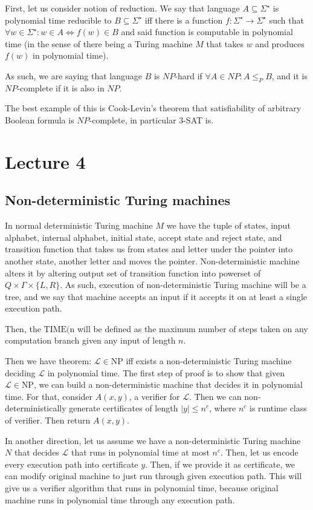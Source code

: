 \documentclass[12pt]{article}
\begin{document}
First, let us consider notion of reduction. We say that language \(A\subseteq \Sigma^{\star}\) is polynomial time reducible to \(B\subseteq \Sigma^{\star}\) iff there is a function \(f\colon \Sigma^{\star}\to \Sigma^{\star}\) such that \(\forall w\in\Sigma^{\star}\colon w\in A\Leftrightarrow f(w)\in B\) and said function is computable in polynomial time (in the sense of there being a Turing machine \(M\) that takes \(w\) and produces \(f(w)\) in polynomial time).

As such, we are saying that language \(B\) is \(NP\)-hard if \(\forall A\in NP\colon A\leq_P B\), and it is \(NP\text{-complete}\) if it is also in \(NP\).

The best example of this is Cook-Levin's theorem that satisfiability of arbitrary Boolean formula is \(NP\)-complete, in particular 3-SAT is.
\section{Lecture 4}
\subsection{Non-deterministic Turing machines}
In normal deterministic Turing machine \(M\) we have the tuple of states, input alphabet, internal alphabet, initial state, accept state and reject state, and transition function that takes us from states and letter under the pointer into another state, another letter and moves the pointer. Non-deterministic machine alters it by altering output set of transition function into powerset of \(Q\times\Gamma\times \{L,R\}\). As such, execution of non-deterministic Turing machine will be a tree, and we say that machine accepts an input if it accepts it on at least a single execution path.

Then, the \(\text{TIME(n}\) will be defined as the maximum number of steps taken on any computation branch given any input of length \(n\).

Then we have theorem: \(\mathcal L\in\text{NP}\) iff exists a non-deterministic Turing machine deciding \(\mathcal L\) in polynomial time.
The first step of proof is to show that given \(\mathcal L\in\text{NP}\), we can build a non-deterministic machine that decides it in polynomial time.
For that, consider \(A(x,y)\), a verifier for \(\mathcal L\). Then we can non-deterministically generate certificates of length \(|y|\leq n^c\),
where \(n^c\) is runtime class of verifier. Then return \(A(x,y)\).

In another direction, let us assume we have a non-deterministic Turing machine \(N\) that decides \(\mathcal L\) that runs in polynomial time at most \(n^c\).
Then, let us encode every execution path into certificate \(y\). Then, if we provide it as certificate, we can modify original machine to just run through given execution path.
This will give us a verifier algorithm that runs in polynomial time, because original machine runs in polynomial time through any execution path.
\end{document}
